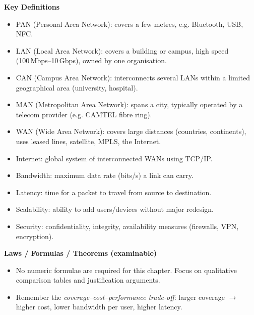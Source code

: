 \documentclass[11pt]{article}
\newcommand{\cle}[1]{{\popxbold\color{popdark}#1}}
\begin{document}
\begin{bilan}
\textbf{Key Definitions}
\begin{itemize}
\item \cle{PAN} (Personal Area Network): covers a few metres, e.g. Bluetooth, USB, NFC.
\item \cle{LAN} (Local Area Network): covers a building or campus, high speed (100 Mbps–10 Gbps), owned by one organisation.
\item \cle{CAN} (Campus Area Network): interconnects several LANs within a limited geographical area (university, hospital).
\item \cle{MAN} (Metropolitan Area Network): spans a city, typically operated by a telecom provider (e.g. CAMTEL fibre ring).
\item \cle{WAN} (Wide Area Network): covers large distances (countries, continents), uses leased lines, satellite, MPLS, the Internet.
\item \cle{Internet}: global system of interconnected WANs using TCP/IP.
\item \cle{Bandwidth}: maximum data rate (bits/s) a link can carry.
\item \cle{Latency}: time for a packet to travel from source to destination.
\item \cle{Scalability}: ability to add users/devices without major redesign.
\item \cle{Security}: confidentiality, integrity, availability measures (firewalls, VPN, encryption).
\end{itemize}

\textbf{Laws / Formulas / Theorems (examinable)}
\begin{itemize}
\item No numeric formulae are required for this chapter. Focus on qualitative comparison tables and justification arguments.
\item Remember the \emph{coverage–cost–performance trade‑off}: larger coverage $\rightarrow$ higher cost, lower bandwidth per user, higher latency.
\end{itemize}


\end{bilan}
\end{document}
